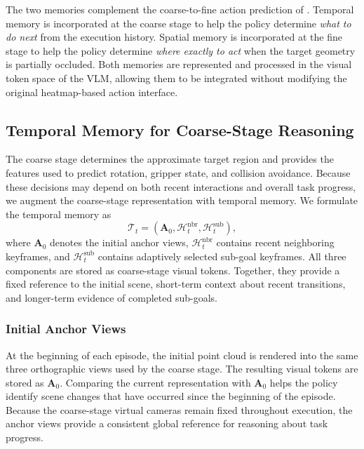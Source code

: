 The two memories complement the coarse-to-fine action prediction of
\method.
Temporal memory is incorporated at the coarse stage to help the policy
determine \emph{what to do next} from the execution history.
Spatial memory is incorporated at the fine stage to help the policy
determine \emph{where exactly to act} when the target geometry is partially
occluded.
Both memories are represented and processed in the visual token space of the
VLM, allowing them to be integrated without modifying the original
heatmap-based action interface.


\subsection{Temporal Memory for Coarse-Stage Reasoning}
\label{sec:memmethod:temporal}

The coarse stage determines the approximate target region and provides the
features used to predict rotation, gripper state, and collision avoidance.
Because these decisions may depend on both recent interactions and overall
task progress, we augment the coarse-stage representation with temporal
memory.
We formulate the temporal memory as
\begin{equation}
    \mathcal{T}_t
    =
    \left(
        \mathbf{A}_0,
        \mathcal{H}^{\mathrm{nbr}}_t,
        \mathcal{H}^{\mathrm{sub}}_t
    \right),
    \label{eq:temporal_memory}
\end{equation}
where $\mathbf{A}_0$ denotes the initial anchor views,
$\mathcal{H}^{\mathrm{nbr}}_t$ contains recent neighboring keyframes, and
$\mathcal{H}^{\mathrm{sub}}_t$ contains adaptively selected sub-goal
keyframes.
All three components are stored as coarse-stage visual tokens.
Together, they provide a fixed reference to the initial scene, short-term
context about recent transitions, and longer-term evidence of completed
sub-goals.


\subsubsection{Initial Anchor Views}
\label{sec:memmethod:anchor}

At the beginning of each episode, the initial point cloud is rendered into
the same three orthographic views used by the coarse stage.
The resulting visual tokens are stored as $\mathbf{A}_0$.
Comparing the current representation with $\mathbf{A}_0$ helps the policy
identify scene changes that have occurred since the beginning of the
episode.
Because the coarse-stage virtual cameras remain fixed throughout execution,
the anchor views provide a consistent global reference for reasoning about
task progress.


